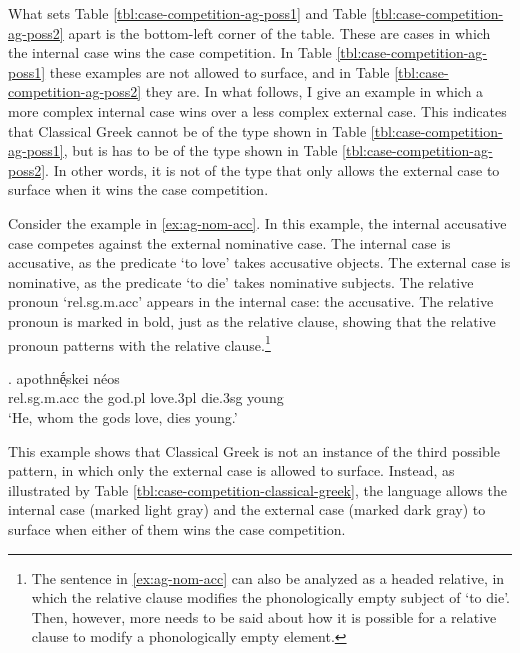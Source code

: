 What sets Table \ref{tbl:case-competition-ag-poss1} and Table \ref{tbl:case-competition-ag-poss2} apart is the bottom-left corner of the table. These are cases in which the internal case wins the case competition.
In Table \ref{tbl:case-competition-ag-poss1} these examples are not allowed to surface, and in Table \ref{tbl:case-competition-ag-poss2} they are.
In what follows, I give an example in which a more complex internal case wins over a less complex external case. This indicates that Classical Greek cannot be of the type shown in Table \ref{tbl:case-competition-ag-poss1}, but is has to be of the type shown in Table \ref{tbl:case-competition-ag-poss2}. In other words, it is not of the type that only allows the external case to surface when it wins the case competition.

Consider the example in \ref{ex:ag-nom-acc}. In this example, the internal accusative case competes against the external nominative case.
The internal case is accusative, as the predicate  `to love' takes accusative objects.
The external case is nominative, as the predicate  `to die' takes nominative subjects.
The relative pronoun  `\ac{rel}.\ac{sg}.\ac{m}.\ac{acc}' appears in the internal case: the accusative. The relative pronoun is marked in bold, just as the relative clause, showing that the relative pronoun patterns with the relative clause.\footnote{
The sentence in \ref{ex:ag-nom-acc} can also be analyzed as a headed relative, in which the relative clause modifies the phonologically empty subject of  `to die'. Then, however, more needs to be said about how it is possible for a relative clause to modify a phonologically empty element.
}

\exg.     apothnḗͅskei néos\\
\ac{rel}.\ac{sg}.\ac{m}.\ac{acc} the god.\ac{pl} love.3\ac{pl}\scsub{[acc]} die.3\ac{sg}\scsub{[nom]} young\\
`He, whom the gods love, dies young.' \label{ex:ag-nom-acc}

This example shows that Classical Greek is not an instance of the third possible pattern, in which only the external case is allowed to surface. Instead, as illustrated by Table \ref{tbl:case-competition-classical-greek}, the language allows the internal case (marked light gray) and the external case (marked dark gray) to surface when either of them wins the case competition.

